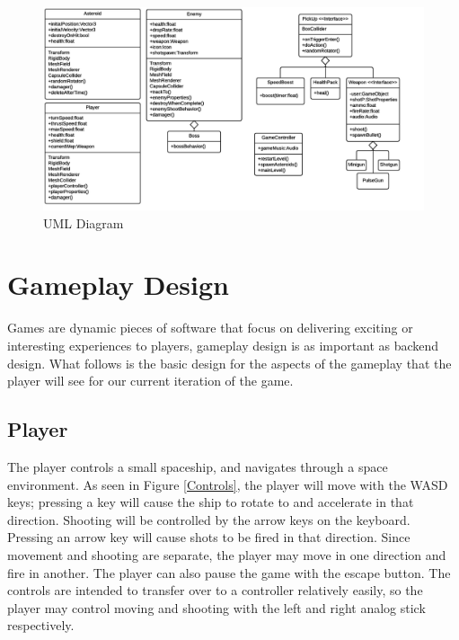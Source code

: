 \documentclass[12pt]{article}       %
\def\hs{\hspace{15pt}}
\begin{document}
\begin{figure} [H]
\centering
\includegraphics[width=7.3in]{FinalUMLHorizontal.png}
\caption{UML Diagram} \label{UML}
\end{figure}


\section{Gameplay Design} %
\label{sec:GPdesign}

Games are dynamic pieces of software that focus on delivering exciting or interesting experiences to players, gameplay design is as important as backend design. What follows is the basic design for the aspects of the gameplay that the player will see for our current iteration of the game.

\subsection{Player} %

	\hs {\bf Player controls: }The player controls a small spaceship, and navigates through a space environment. As seen in Figure \ref{Controls}, the player will move with the WASD keys; pressing a key will cause the ship to rotate to and accelerate in that direction.  Shooting will be controlled by the arrow keys on the keyboard. Pressing an arrow key will cause shots to be fired in that direction. Since movement and shooting are separate, the player may move in one direction and fire in another.  The player can also pause the game with the escape button. The controls are intended to transfer over to a controller relatively easily, so the player may control moving and shooting with the left and right analog stick respectively. \\
\end{document}
